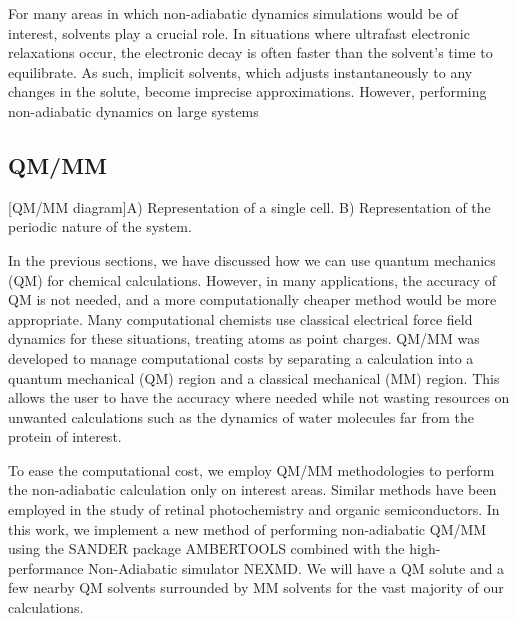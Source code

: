 For many areas in which non-adiabatic dynamics simulations would be of interest, solvents play a crucial role. \cite{bagchi1989dynamics,woo2005solvent}
In situations where ultrafast electronic relaxations occur, the electronic decay is often faster than the solvent's time to equilibrate.
As such, implicit solvents, which adjusts instantaneously to any changes in the solute, become imprecise approximations.
However, performing non-adiabatic dynamics on large systems 

\subsection{QM/MM}
\begin{multiFigure} 
  [QM/MM diagram]{A) Representation of a single cell. B) Representation of the periodic nature of the system.}
  \label{fig:QMMMDiagram}
\end{multiFigure}
\bigskip

In the previous sections, we have discussed how we can use quantum mechanics (QM) for chemical calculations. However, in many applications, the accuracy of QM is not needed, and a more computationally cheaper method would be more appropriate. Many computational chemists use classical electrical force field dynamics for these situations, treating atoms as point charges. QM/MM was developed to manage computational costs by separating a calculation into a quantum mechanical (QM) region and a classical mechanical (MM) region.\cite{warshel1976theoretical,Karplus2014} This allows the user to have the accuracy where needed while not wasting resources on unwanted calculations such as the dynamics of water molecules far from the protein of interest.

To ease the computational cost, we employ QM/MM methodologies to perform the non-adiabatic calculation only on interest areas. Similar methods have been employed in the study of retinal photochemistry and organic semiconductors.\cite{weingart2012modelling,demoulin2017fine,heck2015multi,bayliss1954solvent}
In this work, we implement a new method of performing non-adiabatic QM/MM using the SANDER package AMBERTOOLS combined with the high-performance Non-Adiabatic simulator NEXMD.
We will have a QM solute and a few nearby QM solvents surrounded by MM solvents for the vast majority of our calculations.

